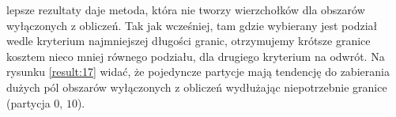 lepsze rezultaty daje metoda, która nie tworzy wierzchołków dla obszarów wyłączonych z obliczeń.
Tak jak wcześniej, tam gdzie wybierany jest podział wedle kryterium najmniejszej długości granic, otrzymujemy krótsze
granice kosztem nieco mniej równego podziału, dla drugiego kryterium na odwrót.
Na rysunku \ref{result:17} widać, że pojedyncze partycje mają tendencję do zabierania dużych pól obszarów wyłączonych z obliczeń
wydłużając niepotrzebnie granice (partycja $0$, $10$).
\begin{figure}[h]
\centering
\begin{subfigure}{.33\textwidth}
    \centering
    \caption[short]{}
\end{subfigure}%
\begin{subfigure}{.33\textwidth}
    \centering

\end{subfigure}
\end{figure}
